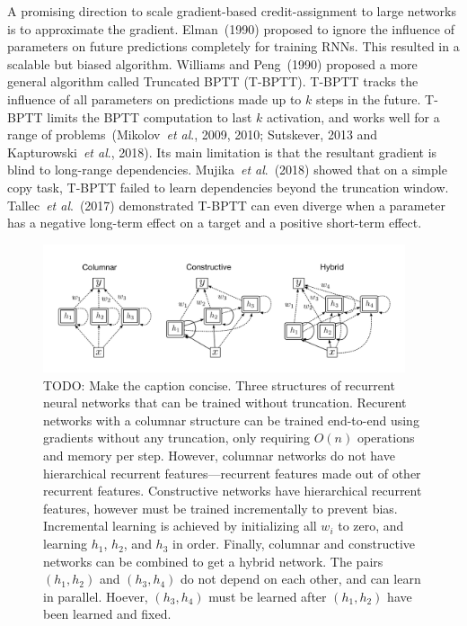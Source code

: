 \documentclass[twoside,11pt]{article}
\newcommand{\etal}{\textit{et al}.}
\begin{document}



A promising direction to scale gradient-based credit-assignment to large networks is to approximate the gradient. Elman~(1990) proposed to ignore the influence of parameters on future predictions completely for training RNNs. This resulted in a scalable but biased algorithm. Williams and Peng~(1990) proposed a more general algorithm called Truncated BPTT (T-BPTT). T-BPTT tracks the influence of all parameters on predictions made up to $k$ steps in the future. T-BPTT limits the BPTT computation to last $k$ activation, and works well for a range of problems~(Mikolov~\etal, 2009, 2010; Sutskever, 2013 and Kapturowski~\etal, 2018). Its main limitation is that the resultant gradient is blind to long-range dependencies. Mujika~\etal~(2018) showed that on a simple copy task, T-BPTT failed to learn dependencies beyond the truncation window. Tallec~\etal~(2017) demonstrated T-BPTT can even diverge when a parameter has a negative long-term effect on a target and a positive short-term effect. 

\begin{figure}
	\centering
	\includegraphics[width=0.95\textwidth]{figures/three_types}
	\caption{TODO: Make the caption concise. Three structures of recurrent neural networks that can be trained without truncation. Recurent networks with a columnar structure can be trained end-to-end using gradients without any truncation, only requiring $O(n)$ operations and memory per step. However, columnar networks do not have hierarchical recurrent features---recurrent features made out of other recurrent features. Constructive networks have hierarchical recurrent features, however must be trained incrementally to prevent bias. Incremental learning is achieved by initializing all $w_i$ to zero, and learning $h_1$, $h_2$, and $h_3$ in order. Finally, columnar and constructive networks can be combined to get a hybrid network. The pairs $(h_1, h_2)$ and $(h_3, h_4)$ do not depend on each other, and can learn in parallel. Hoever, $(h_3, h_4)$ must be learned after $(h_1, h_2)$ have been learned and fixed.}
\end{figure}
\end{document}

